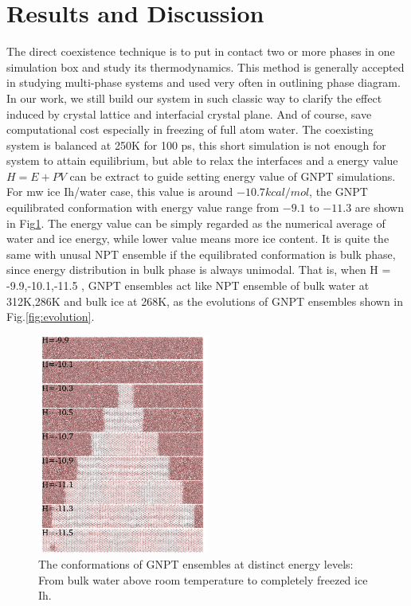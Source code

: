 \documentclass[aps,prl,twocolumn,superscriptaddress]{revtex4-1}
\begin{document}
\section{Results and Discussion} 
The direct coexistence technique is to put in contact two or more phases in one simulation box and study its thermodynamics. This method is generally accepted in studying multi-phase systems and used very often in outlining phase diagram\cite{Conde2017,Sanz2004,Watanabe2012}. In our work, we still build our system in such classic way to clarify the effect induced by crystal lattice and interfacial crystal plane. And of course, save computational cost especially in freezing of full atom water. The coexisting system is balanced at 250K for 100 ps, this short simulation is not enough for system to attain equilibrium, but able to relax the interfaces and a energy value $H=E+PV$ can be extract to guide setting  energy value of GNPT simulations. For mw ice Ih/water case, this value is around $-10.7 kcal/mol$,  the GNPT equilibrated conformation with energy value range from $-9.1$ to $-11.3$ are shown in Fig\ref{fig:conformation}. The energy value can be simply regarded as the numerical average of water and ice energy, while lower value means more ice content. It is quite the same with unusal NPT ensemble if the equilibrated conformation is bulk phase, since energy distribution in bulk phase is always unimodal. That is, when H = -9.9,-10.1,-11.5 , GNPT ensembles act like NPT ensemble of bulk water at 312K,286K and bulk ice at 268K, as the evolutions of GNPT ensembles  shown in Fig.\ref{fig:evolution}.
\begin{figure}[ht]
\centering{}\includegraphics[width=0.5\textwidth]{conf.png} 
\caption{The conformations of GNPT ensembles at distinct energy levels: From bulk water above room temperature to completely freezed ice Ih.
\label{fig:conformation} }
\end{figure}
\end{document}
